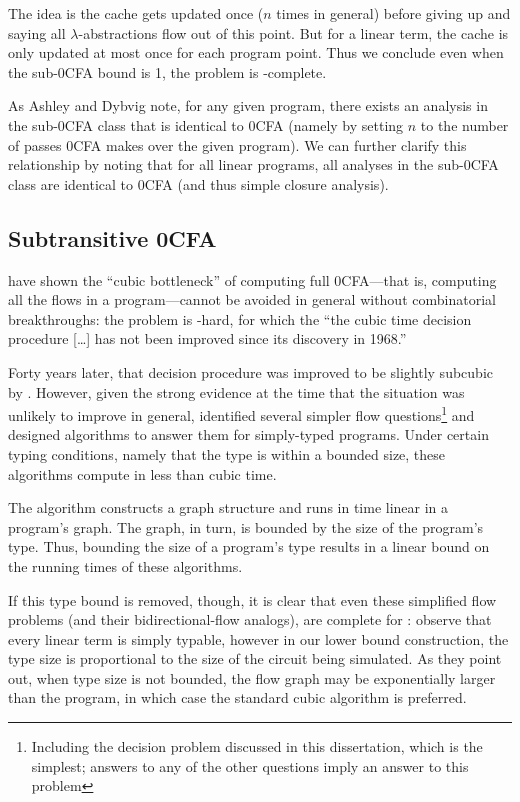 The idea is the cache gets updated once ($n$ times in general) before
giving up and saying all $\lambda$-abstractions flow out of this
point.  But for a linear term, the cache is only updated at most once
for each program point.  Thus we conclude even when the sub-0CFA bound
is 1, the problem is \ptime-complete.

As Ashley and Dybvig note, for any given program, there exists an
analysis in the sub-0CFA class that is identical to 0CFA (namely by
setting $n$ to the number of passes 0CFA makes over the given
program).  We can further clarify this relationship by noting that for
all linear programs, all analyses in the sub-0CFA class are identical
to 0CFA (and thus simple closure analysis).

\subsection{Subtransitive 0CFA}

\citet{heintze-mcallester-lics97} have shown the ``cubic bottleneck''
of computing full 0CFA---that is, computing all the flows in a
program---cannot be avoided in general without combinatorial
breakthroughs: the problem is {}-hard, for which the ``the
cubic time decision procedure [\dots] has not been improved since its
discovery in 1968.''

Forty years later, that decision procedure was improved to be slightly
subcubic by \citet{chaudhuri-popl08}.  However, given the strong
evidence at the time that the situation was unlikely to improve in
general, \citet{heintze-mcallester-pldi97} identified several simpler
flow questions\footnote{Including the decision problem discussed in
  this dissertation, which is the simplest; answers to any of the
  other questions imply an answer to this problem} and designed
algorithms to answer them for simply-typed programs. Under certain
typing conditions, namely that the type is within a bounded size,
these algorithms compute in less than cubic time.

The algorithm constructs a graph structure and runs in time linear in a
program's graph.  The graph, in turn, is bounded by the size of the
program's type.  Thus, bounding the size of a program's type results
in a linear bound on the running times of these algorithms.  

If this type bound is removed, though, it is clear that even these
simplified flow problems (and their bidirectional-flow analogs), are
complete for \ptime: observe that every linear term is simply typable,
however in our lower bound construction, the type size is proportional
to the size of the circuit being simulated.  As they point out, when
type size is not bounded, the flow graph may be exponentially larger
than the program, in which case the standard cubic algorithm is
preferred.

